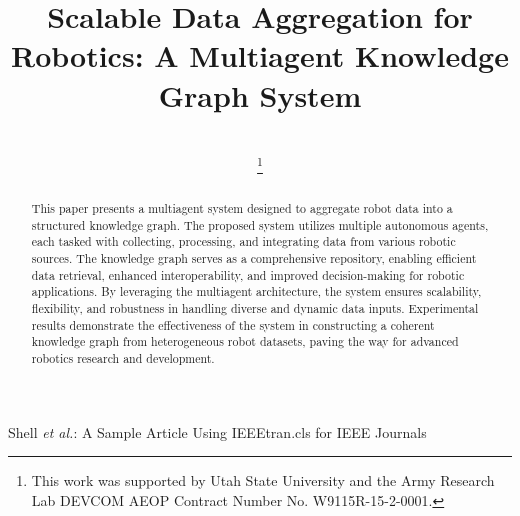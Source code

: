 \documentclass[journal]{IEEEtran}
\begin{document}
\title{Scalable Data Aggregation for Robotics: A Multiagent Knowledge Graph System }


\author{
\\
\thanks{This work was supported by Utah State University and the Army Research Lab DEVCOM AEOP  Contract Number No. W9115R-15-2-0001.}
}


%
{Shell \MakeLowercase{\textit{et al.}}: A Sample Article Using IEEEtran.cls for IEEE Journals}




\graphicspath{ {./images/} }
\maketitle


\begin{abstract}
This paper presents a multiagent system designed to aggregate robot data into a structured 
knowledge graph. The proposed system utilizes multiple autonomous agents, each tasked with 
collecting, processing, and integrating data from various robotic sources. The knowledge 
graph serves as a comprehensive repository, enabling efficient data retrieval, enhanced 
interoperability, and improved decision-making for robotic applications. By leveraging 
the multiagent architecture, the system ensures scalability, flexibility, and robustness 
in handling diverse and dynamic data inputs. Experimental results demonstrate the 
effectiveness of the system in constructing a coherent knowledge graph from heterogeneous 
robot datasets, paving the way for advanced robotics research and development.
\end{abstract}
\end{document}
